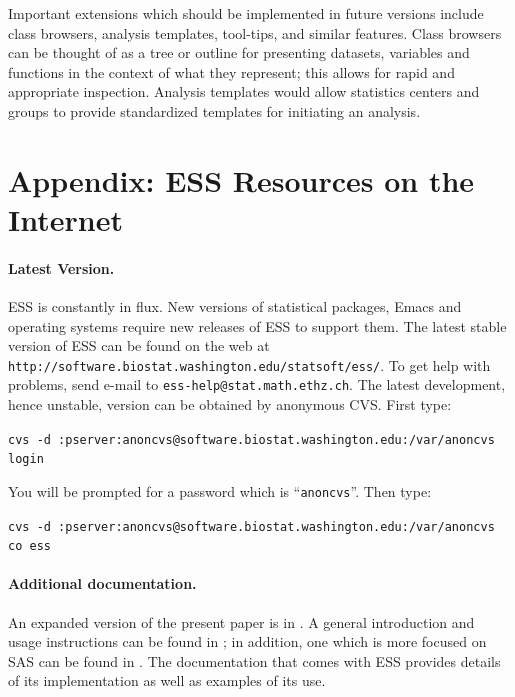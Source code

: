 \documentclass{article}
\def\url#1{\stexttt{#1}} %
\newcommand*{\SAS}{\textsc{SAS}}
\newcommand{\stexttt}[1]{{\small\texttt{#1}}}
\begin{document}

Important extensions which should be implemented in future
versions include class browsers, analysis templates, tool-tips, and
similar features.  Class browsers can be thought of as a tree or
outline for presenting datasets, variables and functions in the
context of what they represent; this allows for rapid and appropriate
inspection.  Analysis templates would allow statistics centers and
groups to provide standardized templates for initiating an analysis.






\clearpage

\appendix 
\section{Appendix: ESS Resources on the Internet}
\label{sec:access}

\paragraph{Latest Version.}

ESS is constantly in flux.  New versions of statistical
packages, Emacs and operating systems require new releases of ESS to
support them.  The latest stable version of ESS can be found on the web at
\url{http://software.biostat.washington.edu/statsoft/ess/}.  To get help
with problems, send e-mail to \url{ess-help@stat.math.ethz.ch}.
The latest development, hence unstable, version can be obtained by
anonymous CVS.  First type:

\stexttt{cvs -d
  :pserver:anoncvs@software.biostat.washington.edu:/var/anoncvs login}
  
You will be prompted for a password which is ``\stexttt{anoncvs}''.
Then type:

\stexttt{cvs -d
  :pserver:anoncvs@software.biostat.washington.edu:/var/anoncvs co
  ess}

\paragraph{Additional documentation.} 

An expanded version of the present paper is in \citep{RMHHS:2001}.  A
general introduction and usage instructions can be found in
\citep{heiberger:dsc:2001}; in addition, one which is more focused on
SAS can be found in \citep{heiberger:philasugi:2001}.  The
documentation that comes with ESS provides details of its
implementation as well as examples of its use.
\end{document}
